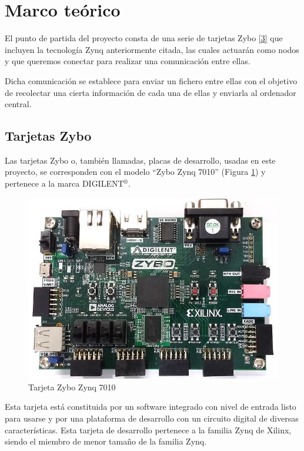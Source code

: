 \section{Marco teórico}
El punto de partida del proyecto consta de una serie de tarjetas Zybo \hyperlink{3}{[3]} que incluyen la tecnología Zynq anteriormente citada, las cuales actuarán como nodos y que queremos conectar para realizar una comunicación entre ellas.

Dicha comunicación se establece para enviar un fichero entre ellas con el objetivo de recolectar una cierta información de cada una de ellas y enviarla al ordenador central.

\subsection{Tarjetas Zybo}
Las tarjetas Zybo o, también llamadas, placas de desarrollo, usadas en este proyecto, se corresponden con el modelo ``Zybo Zynq 7010'' (Figura \ref{Tarjeta Zybo Zynq 7010}) y pertenece a la marca DIGILENT$^{\circledR}$.

\begin{figure}[h]
	\centering
	\includegraphics[scale=0.5]{Metodologia/MarcoTeorico/zybo.jpg}
	\caption{Tarjeta Zybo Zynq 7010}
	\label{Tarjeta Zybo Zynq 7010}
\end{figure}

Esta tarjeta está constituida por un software integrado con nivel de entrada listo para usarse y por una plataforma de desarrollo con un circuito digital de diversas características. Esta tarjeta de desarrollo pertenece a la familia Zynq de Xilinx, siendo el miembro de menor tamaño de la familia Zynq.

